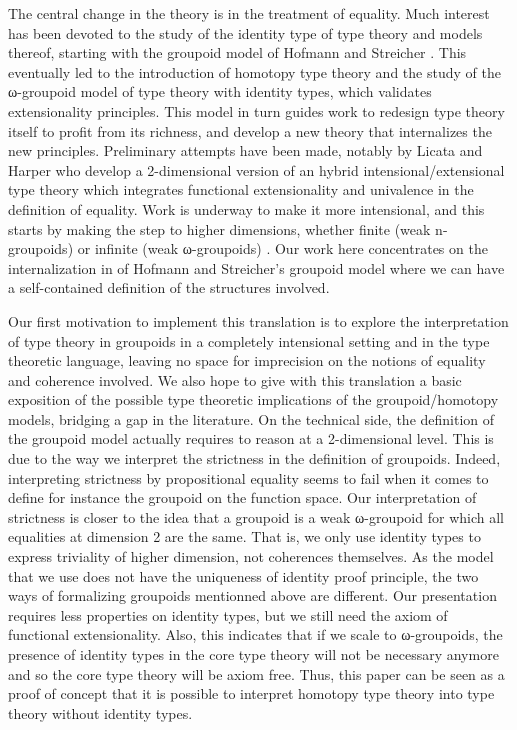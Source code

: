 The central change in the theory is in the treatment of equality.  Much
interest has been devoted to the study of the identity type of type
theory and models thereof, starting with the groupoid model of Hofmann
and Streicher \cite{groupoid-interp}. This eventually led to the
introduction of homotopy type theory and the study of the ω-groupoid
model of type theory with identity types, which validates extensionality
principles.
This model in turn
guides work to redesign type theory itself to profit from its
richness, and develop a new theory that internalizes the new
principles. Preliminary attempts have been made, notably by Licata and
Harper \cite{DBLP:conf/popl/LicataH12} who develop a 2-dimensional
version of an hybrid intensional/extensional type theory which
integrates functional extensionality and univalence in the definition
of equality. Work is underway to make it more intensional, and this
starts by making the step to higher dimensions, whether finite (weak
n-groupoids) or infinite (weak ω-groupoids)
\cite{DBLP:conf/csl/AltenkirchR12}. %
%
Our work here concentrates on the internalization in \Coq of Hofmann and
Streicher's groupoid model where we can have a self-contained definition
of the structures involved.

Our first motivation to implement this translation is to explore the
interpretation of type theory in groupoids in a completely
intensional setting and in the type theoretic language, leaving no space
for imprecision on the notions of equality and coherence involved.  We
also hope to give with this translation a basic exposition of the
possible type theoretic implications of the groupoid/homotopy models,
bridging a gap in the literature. 
%
On the technical side, the definition of the groupoid model actually
requires to reason at a 2-dimensional level. This is due to the way we
interpret the strictness in the definition of groupoids. 
%
Indeed, interpreting strictness by propositional equality seems to fail
when it comes to define for instance the groupoid on the function
space. Our interpretation of strictness is closer to the idea that a
groupoid is a weak ω-groupoid for which all equalities at dimension 2
are the same. 
%
That is, we only use identity types to express triviality of higher
dimension, not coherences themselves. 
%
As the model that we use does not have the uniqueness of identity proof
principle, the two ways of formalizing groupoids mentionned above are
different.
%
Our presentation requires less properties on identity types,
but we still need the axiom of functional extensionality.
%
Also, this indicates that if we scale to ω-groupoids, the presence of
identity types in the core type theory will
not be necessary anymore and so the core type theory will be axiom free.
%
Thus, this paper can be seen as a proof of concept that it is possible
to interpret homotopy type theory into type theory without identity
types.


